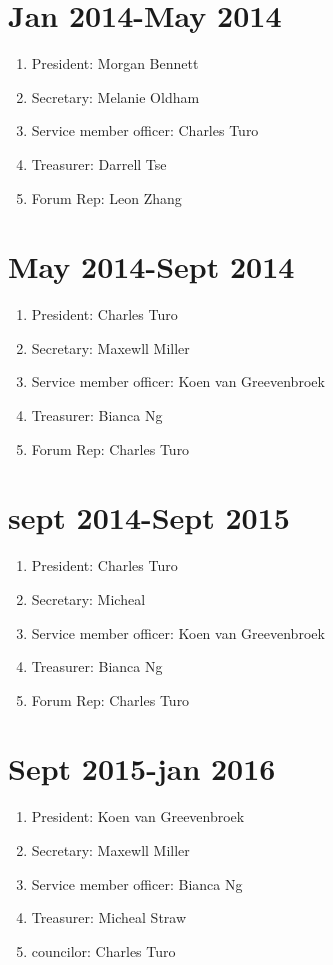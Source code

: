 \documentclass[12pt]{amsart}
\begin{document}
\begin{flushleft}
\section*{Jan 2014-May 2014}

\begin{enumerate}[label=(\alph*)]
\item President: Morgan Bennett
\item Secretary: Melanie Oldham
\item Service member officer: Charles Turo
\item Treasurer: Darrell Tse
\item Forum Rep: Leon Zhang
\end{enumerate}

\section*{May 2014-Sept 2014}

\begin{enumerate}[label=(\alph*)]
\item President: Charles Turo
\item Secretary: Maxewll Miller
\item Service member officer: Koen van Greevenbroek
\item Treasurer: Bianca Ng
\item Forum Rep: Charles Turo
\end{enumerate}

\section*{sept 2014-Sept 2015}

\begin{enumerate}[label=(\alph*)]
\item President: Charles Turo
\item Secretary: Micheal
\item Service member officer: Koen van Greevenbroek
\item Treasurer: Bianca Ng
\item Forum Rep: Charles Turo
\end{enumerate}

\section*{Sept 2015-jan 2016}

\begin{enumerate}[label=(\alph*)]
\item President: Koen van Greevenbroek
\item Secretary: Maxewll Miller
\item Service member officer: Bianca Ng
\item Treasurer: Micheal Straw
\item councilor: Charles Turo
\end{enumerate}



\end{flushleft}
\end{document}

